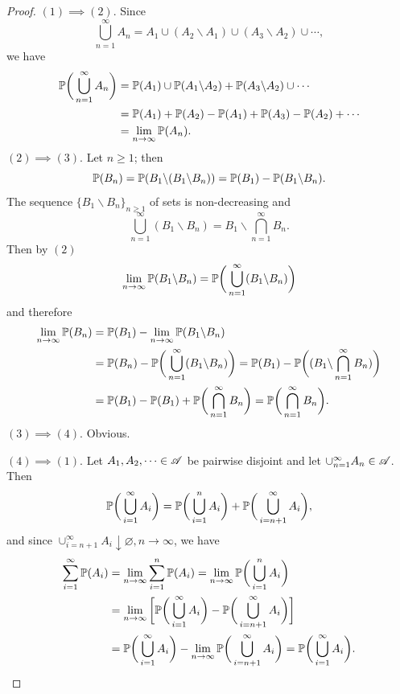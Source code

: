 \begin{proof}
$(1) \implies (2)$. Since
\begin{equation*}
    \bigcup_{n=1}^\infty A_n = A_1 \cup (A_2\backslash A_1) \cup (A_3\backslash A_2) \cup \cdots,
\end{equation*}
we have
\begin{align*}
    \mathbb{P} \bigg( \bigcup_{n=1}^\infty A_n \bigg) &= \mathbb{P}(A_1) \cup \mathbb{P}(A_1\backslash A_2) + \mathbb{P}(A_3\backslash A_2) \cup \cdots\\
    &= \mathbb{P}(A_1) + \mathbb{P}(A_2) - \mathbb{P}(A_1) + \mathbb{P}(A_3) - \mathbb{P}(A_2) + \cdots\\
    &= \lim_{n\rightarrow \infty} \mathbb{P}(A_n).
\end{align*}
$(2) \implies (3)$. Let $n \ge 1$; then
\begin{equation*}
    \mathbb{P}(B_n) = \mathbb{P}(B_1 \backslash (B_1 \backslash B_n)) = \mathbb{P} (B_1) - \mathbb{P}(B_1 \backslash B_n).
\end{equation*}
The sequence $\{ B_1 \backslash B_n \}_{n\ge1}$ of sets is non-decreasing and 
\begin{equation*}
    \bigcup_{n=1}^\infty (B_1 \backslash B_n) = B_1 \backslash \bigcap_{n=1}^\infty B_n.
\end{equation*}
Then by $(2)$
\begin{equation*}
    \lim_{n \rightarrow \infty} \mathbb{P}(B_1 \backslash B_n) = \mathbb{P} \bigg( \bigcup_{n=1}^\infty (B_1 \backslash B_n)\bigg)
\end{equation*}
and therefore
\begin{align*}
    \lim_{n \rightarrow \infty} \mathbb{P}(B_n) &= \mathbb{P}(B_1) - \lim_{n \rightarrow \infty} \mathbb{P}(B_1 \backslash B_n)\\
    &= \mathbb{P}(B_n) - \mathbb{P} \bigg( \bigcup_{n=1}^\infty (B_1 \backslash B_n)\bigg) = \mathbb{P}(B_1) - \mathbb{P} \bigg( (B_1 \backslash \bigcap_{n=1}^\infty B_n)\bigg)\\
    &= \mathbb{P} (B_1) - \mathbb{P} (B_1) + \mathbb{P} \bigg( \bigcap_{n=1}^\infty  B_n\bigg) = \mathbb{P} \bigg( \bigcap_{n=1}^\infty  B_n\bigg).
\end{align*}
$(3) \implies (4)$. Obvious.

$(4) \implies (1)$. Let $A_1, A_2, \dots \in \mathcal{A}$ be pairwise disjoint and let $ \cup_{n=1}^\infty A_n \in \mathcal{A}$. Then 
\begin{equation*}
    \mathbb{P} \bigg( \bigcup_{i=1}^\infty A_i \bigg) = \mathbb{P} \bigg( \bigcup_{i=1}^n A_i\bigg) + \mathbb{P} \bigg( \bigcup_{i=n+1}^\infty A_i \bigg),
\end{equation*}
and since $\cup_{i=n+1}^\infty A_i \downarrow \varnothing, n\rightarrow \infty$, we have 
\begin{align*}
    \sum_{i=1}^\infty \mathbb{P}(A_i) &= \lim_{n \rightarrow \infty} \sum_{i=1}^n \mathbb{P}(A_i) = \lim_{n \rightarrow \infty} \mathbb{P} \bigg( \bigcup_{i=1}^n A_i\bigg)\\
    &= \lim_{n \rightarrow \infty} \bigg[ \mathbb{P}\bigg( \bigcup_{i=1}^\infty A_i\bigg) - \mathbb{P}\bigg( \bigcup_{i=n+1}^\infty A_i\bigg) \bigg]\\
    &= \mathbb{P} \bigg( \bigcup_{i=1}^\infty A_i \bigg) - \lim_{n \rightarrow \infty}  \mathbb{P} \bigg( \bigcup_{i=n+1}^\infty A_i \bigg) =  \mathbb{P} \bigg( \bigcup_{i=1}^\infty A_i \bigg).
\end{align*}
\end{proof}



